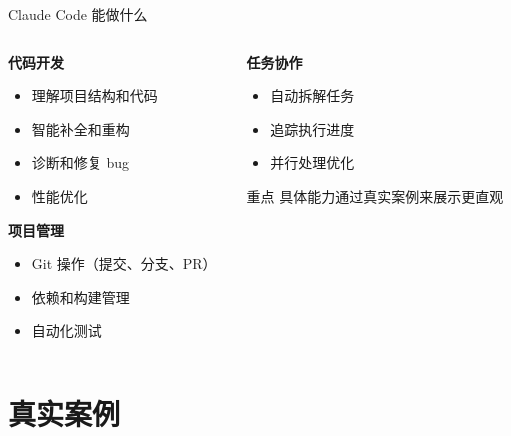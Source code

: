 \documentclass[aspectratio=169,xcolor=dvipsnames]{beamer}
\begin{document}
\begin{frame}{Claude Code 能做什么}
  \begin{columns}
    \begin{column}{0.48\textwidth}
      \textbf{代码开发}
      \begin{itemize}
        \item 理解项目结构和代码
        \item 智能补全和重构
        \item 诊断和修复 bug
        \item 性能优化
      \end{itemize}

      \vspace{0.3cm}

      \textbf{项目管理}
      \begin{itemize}
        \item Git 操作（提交、分支、PR）
        \item 依赖和构建管理
        \item 自动化测试
      \end{itemize}
    \end{column}
    \begin{column}{0.48\textwidth}
      \textbf{任务协作}
      \begin{itemize}
        \item 自动拆解任务
        \item 追踪执行进度
        \item 并行处理优化
      \end{itemize}

      \vspace{0.3cm}

      \begin{exampleblock}{重点}
        具体能力通过真实案例来展示更直观
      \end{exampleblock}
    \end{column}
  \end{columns}
\end{frame}

\section{真实案例}
\end{document}
